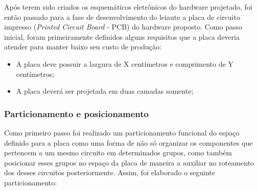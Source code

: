 Após terem sido criados os esquemáticos eletrônicos do hardware projetado, foi então passado para a fase de desenvolvimento do leiaute a placa de circuito impresso (\textit{Printed Circuit Board} - PCB) do hardware proposto. Como passo inicial, foram primeiramente definidos alguns requisitos que a placa deveria atender para manter baixo seu custo de produção:

\begin{itemize}
    \item A placa deve possuir a largura de X centímetros e comprimento de Y centímetros;
    
    \item A placa deverá ser projetada em duas camadas somente; 
\end{itemize}


\subsubsection{Particionamento e posicionamento}

Como primeiro passo foi realizado um particionamento funcional do espaço definido para a placa como uma forma de não só organizar os componentes que pertencem a um mesmo circuito em determinados grupos, como também posicionar esses grupos no espaço da placa de maneira a auxiliar no roteamento dos desses circuitos posteriormente. Assim, foi elaborado o seguinte particionamento:


    \begin{figure}[h!]
            \captionsetup{width=16cm}
   \end{figure}


